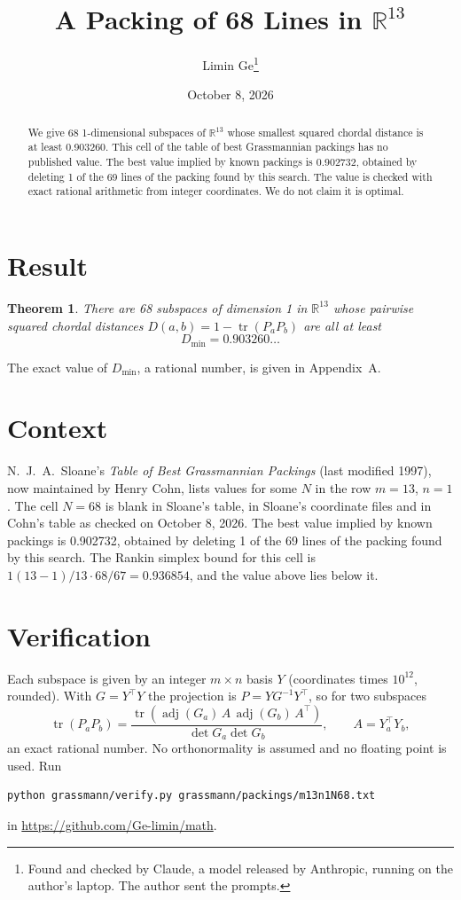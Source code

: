 \documentclass[11pt,a4paper]{article}
\title{A Packing of 68 Lines in $\mathbb{R}^{13}$}
\author{Limin Ge\thanks{Found and checked by Claude, a model released by Anthropic, running on the author's laptop. The author sent the prompts.}}
\date{October 8, 2026}
\newtheorem*{theorem}{Theorem}
\begin{document}
\maketitle
\begin{abstract}
We give 68 1-dimensional subspaces of $\mathbb{R}^{13}$ whose smallest squared chordal distance is at least 0.903260. This cell of the table of best Grassmannian packings has no published value. The best value implied by known packings is 0.902732, obtained by deleting 1 of the 69 lines of the packing found by this search. The value is checked with exact rational arithmetic from integer coordinates. We do not claim it is optimal.
\end{abstract}

\section{Result}
\begin{theorem}
There are 68 subspaces of dimension 1 in $\mathbb{R}^{13}$ whose pairwise squared chordal distances $D(a,b) = 1 - \operatorname{tr}(P_aP_b)$ are all at least
\[ D_{\min} = 0.903260\ldots \]
\end{theorem}
The exact value of $D_{\min}$, a rational number, is given in Appendix~A.


\section{Context}
N.~J.~A.~Sloane's \emph{Table of Best Grassmannian Packings} (last modified 1997), now maintained by Henry Cohn, lists values for some $N$ in the row $m=13$, $n=1$. The cell $N=68$ is blank in Sloane's table, in Sloane's coordinate files and in Cohn's table as checked on October 8, 2026. The best value implied by known packings is 0.902732, obtained by deleting 1 of the 69 lines of the packing found by this search. The Rankin simplex bound for this cell is $1(13-1)/13\cdot 68/67 = 0.936854$, and the value above lies below it.


\section{Verification}
Each subspace is given by an integer $m\times n$ basis $Y$ (coordinates times $10^{12}$, rounded). With $G=Y^\top Y$ the projection is $P=YG^{-1}Y^\top$, so for two subspaces
\[ \operatorname{tr}(P_aP_b)=\frac{\operatorname{tr}(\operatorname{adj}(G_a)\,A\,\operatorname{adj}(G_b)\,A^\top)}{\det G_a\det G_b},\qquad A=Y_a^\top Y_b, \]
an exact rational number. No orthonormality is assumed and no floating point is used. Run
\begin{verbatim}
python grassmann/verify.py grassmann/packings/m13n1N68.txt
\end{verbatim}
in \url{https://github.com/Ge-limin/math}.
\end{document}
